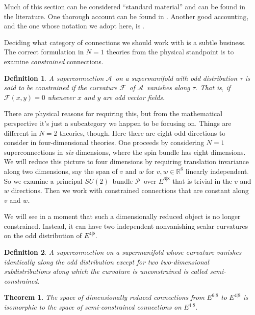 \documentclass[twoside]{amsart}
\newcommand{\RR}{\ensuremath{\mathbb{R}}}
\newtheorem{theorem}{Theorem}
\newtheorem{definition}{Definition}
\newcommand{\enm}[1]{\ensuremath{#1}}
\newcommand{\superijk}[3]{\enm{{#1}^{#2|#3}}}
\newcommand{\rrij}[2]{\superijk{E}{#1}{#2}}
\renewcommand{\aa}{\enm{\mathcal{A}}}
\newcommand{\sut}{\enm{SU(2)}}
\newcommand{\pp}{\enm{\mathcal{P}}}
\newcommand{\susols}{\cite{susols}}
\newcommand{\ff}{\enm{\mathcal{F}}}
\begin{document}
Much of this section can be considered ``standard material'' and can
be found in the literature.  One thorough account can be found in
\cite{phong}.  Another good accounting, and the one whose notation we
adopt here, is \susols.

Deciding what category of connections we should work with is a subtle
business.  The correct formulation in \( N=1 \) theories from the
physical standpoint is to examine \emph{constrained} connections.

\begin{definition}
    A superconnection \aa\ on a supermanifold with odd
    distribution \( \tau \)
    is said to be \emph{constrained} if the curvature \ff\ of \aa\
    vanishes along \( \tau \).  That is, if \( \ff(x, y) = 0 \)
    whenever \( x \) and \( y \) are odd vector fields.
\end{definition}
There are physical reasons for requiring this, but from the
mathematical perspective it's just a subcategory we happen to be
focusing on.  Things are different in \( N=2 \) theories, though.
Here there are eight odd directions to consider in four-dimensional
theories.  One proceeds by considering \( N=1 \) superconnections in
\emph{six} dimensions, where the spin bundle has eight
dimensions.  We will reduce this picture to four dimensions by
requiring translation invariance along two dimensions, say the span of
\( v \) and \( w \) for \( v, w\in\RR^{6} \) linearly independent.  So
we examine a principal \sut\ bundle \pp\ over \rrij{6}{8} that is
trivial in
the \( v \) and \( w \) directions.  Then we work with constrained
connections that are constant along \( v \) and \( w \).

We will see in a moment that such a dimensionally reduced object is
no longer constrained.  Instead, it can have two independent
nonvanishing scalar curvatures on the odd distribution of
\rrij{4}{8}.

\begin{definition}
    A superconnection on a supermanifold whose curvature
    vanishes identically along the odd distribution except for two
    two-dimensional subdistributions along which the curvature is
    unconstrained is called \emph{semi-constrained}.
\end{definition}

\begin{theorem}
    \label{thm:semiconstrained}
    The space of dimensionally reduced connections from \rrij{6}{8} to
    \rrij{4}{8} is isomorphic to the space of semi-constrained
    connections on \rrij{4}{8}.
\end{theorem}
\end{document}
